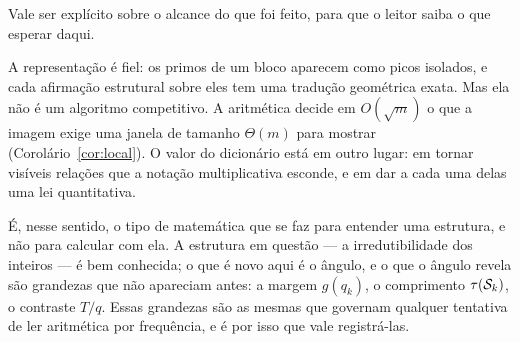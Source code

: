 Vale ser explícito sobre o alcance do que foi feito, para que o leitor saiba o que
esperar daqui.

A representação é fiel: os primos de um bloco aparecem como picos isolados, e
cada afirmação estrutural sobre eles tem uma tradução geométrica exata. Mas ela
não é um algoritmo competitivo. A aritmética decide em $O(\sqrt m)$ o que a
imagem exige uma janela de tamanho $\Theta(m)$ para mostrar
(Corolário~\ref{cor:local}). O valor do dicionário está em outro lugar: em tornar
visíveis relações que a notação multiplicativa esconde, e em dar a cada uma delas
uma lei quantitativa.

É, nesse sentido, o tipo de matemática que se faz para entender uma estrutura, e
não para calcular com ela. A estrutura em questão — a irredutibilidade dos
inteiros — é bem conhecida; o que é novo aqui é o ângulo, e o que o ângulo revela
são grandezas que não apareciam antes: a margem $g(q_k)$, o comprimento
$\tau(\mathcal{S}_k)$, o contraste $T/q$. Essas grandezas são as mesmas que governam
qualquer tentativa de ler aritmética por frequência, e é por isso que vale
registrá-las.
